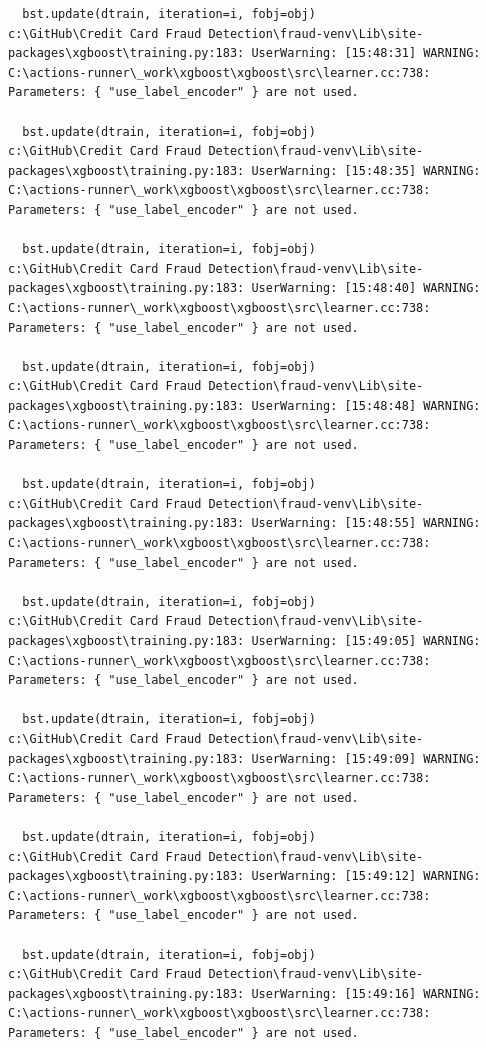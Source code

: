 \documentclass[
  letterpaper,
  DIV=11,
  numbers=noendperiod]{scrartcl}
\begin{document}
\begin{verbatim}
  bst.update(dtrain, iteration=i, fobj=obj)
c:\GitHub\Credit Card Fraud Detection\fraud-venv\Lib\site-packages\xgboost\training.py:183: UserWarning: [15:48:31] WARNING: C:\actions-runner\_work\xgboost\xgboost\src\learner.cc:738: 
Parameters: { "use_label_encoder" } are not used.

  bst.update(dtrain, iteration=i, fobj=obj)
c:\GitHub\Credit Card Fraud Detection\fraud-venv\Lib\site-packages\xgboost\training.py:183: UserWarning: [15:48:35] WARNING: C:\actions-runner\_work\xgboost\xgboost\src\learner.cc:738: 
Parameters: { "use_label_encoder" } are not used.

  bst.update(dtrain, iteration=i, fobj=obj)
c:\GitHub\Credit Card Fraud Detection\fraud-venv\Lib\site-packages\xgboost\training.py:183: UserWarning: [15:48:40] WARNING: C:\actions-runner\_work\xgboost\xgboost\src\learner.cc:738: 
Parameters: { "use_label_encoder" } are not used.

  bst.update(dtrain, iteration=i, fobj=obj)
c:\GitHub\Credit Card Fraud Detection\fraud-venv\Lib\site-packages\xgboost\training.py:183: UserWarning: [15:48:48] WARNING: C:\actions-runner\_work\xgboost\xgboost\src\learner.cc:738: 
Parameters: { "use_label_encoder" } are not used.

  bst.update(dtrain, iteration=i, fobj=obj)
c:\GitHub\Credit Card Fraud Detection\fraud-venv\Lib\site-packages\xgboost\training.py:183: UserWarning: [15:48:55] WARNING: C:\actions-runner\_work\xgboost\xgboost\src\learner.cc:738: 
Parameters: { "use_label_encoder" } are not used.

  bst.update(dtrain, iteration=i, fobj=obj)
c:\GitHub\Credit Card Fraud Detection\fraud-venv\Lib\site-packages\xgboost\training.py:183: UserWarning: [15:49:05] WARNING: C:\actions-runner\_work\xgboost\xgboost\src\learner.cc:738: 
Parameters: { "use_label_encoder" } are not used.

  bst.update(dtrain, iteration=i, fobj=obj)
c:\GitHub\Credit Card Fraud Detection\fraud-venv\Lib\site-packages\xgboost\training.py:183: UserWarning: [15:49:09] WARNING: C:\actions-runner\_work\xgboost\xgboost\src\learner.cc:738: 
Parameters: { "use_label_encoder" } are not used.

  bst.update(dtrain, iteration=i, fobj=obj)
c:\GitHub\Credit Card Fraud Detection\fraud-venv\Lib\site-packages\xgboost\training.py:183: UserWarning: [15:49:12] WARNING: C:\actions-runner\_work\xgboost\xgboost\src\learner.cc:738: 
Parameters: { "use_label_encoder" } are not used.

  bst.update(dtrain, iteration=i, fobj=obj)
c:\GitHub\Credit Card Fraud Detection\fraud-venv\Lib\site-packages\xgboost\training.py:183: UserWarning: [15:49:16] WARNING: C:\actions-runner\_work\xgboost\xgboost\src\learner.cc:738: 
Parameters: { "use_label_encoder" } are not used.


\end{verbatim}
\end{document}
